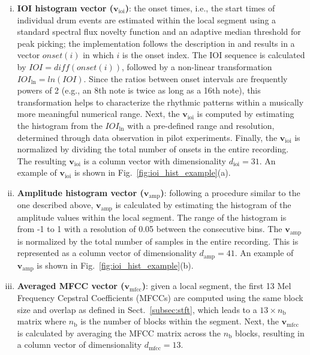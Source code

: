 \documentclass[conference]{IEEEtran}
\begin{document}
\begin{enumerate}[(i)]
    \item   \textbf{IOI histogram vector ($\mathbf{v}_\mathrm{ioi}$)}: the onset times, i.e., the start times of individual drum events are estimated within the local segment using a standard spectral flux novelty function and an adaptive median threshold for peak picking; the implementation follows the description in \cite{Lerch2012} and results in a vector $onset(i)$ in which $i$ is the onset index. The IOI sequence is calculated by $IOI = diff(onset(i))$, followed by a non-linear transformation $IOI_\mathrm{ln} = ln(IOI)$. Since the ratios between onset intervals are frequently powers of 2 (e.g., an 8th note is twice as long as a 16th note), this transformation helps to characterize the rhythmic patterns within a musically more meaningful numerical range. Next, the $\mathbf{v}_\mathrm{ioi}$ is computed by estimating the histogram from the $IOI_\mathrm{ln}$ with a pre-defined range and resolution, determined through data observation in pilot experiments. Finally, the $\mathbf{v}_\mathrm{ioi}$ is normalized by dividing the total number of onsets in the entire recording. The resulting $\mathbf{v}_\mathrm{ioi}$ is a column vector with dimensionality $d_\mathrm{ioi} = 31$. An example of  $\mathbf{v}_\mathrm{ioi}$ is shown in Fig.~\ref{fig:ioi_hist_example}(a).

    \item   \textbf{Amplitude histogram vector ($\mathbf{v}_\mathrm{amp}$)}: following a procedure similar to the one described above, $\mathbf{v}_\mathrm{amp}$ is calculated by estimating the histogram of the amplitude values within the local segment. The range of the histogram is from -1 to 1 with a resolution of 0.05 between the consecutive bins. The $\mathbf{v}_\mathrm{amp}$ is normalized by the total number of samples in the entire recording. This is represented as a column vector of dimensionality $d_\mathrm{amp} = 41$. An example of  $\mathbf{v}_\mathrm{amp}$ is shown in Fig.~\ref{fig:ioi_hist_example}(b).

    \item   \textbf{Averaged MFCC vector ($\mathbf{v}_\mathrm{mfcc}$)}: given a local segment, the first 13 Mel Frequency Cepstral Coefficients (MFCCs) are computed using the same block size and overlap as defined in Sect.~\ref{subsec:stft}, which leads to a $13 \times n_\mathrm{b}$ matrix where $n_\mathrm{b}$ is the number of blocks within the segment. Next, the $\mathbf{v}_\mathrm{mfcc}$ is calculated by averaging the MFCC matrix across the $n_\mathrm{b}$ blocks, resulting in a column vector of dimensionality $d_\mathrm{mfcc} = 13$. 
\end{enumerate} 
\end{document}
